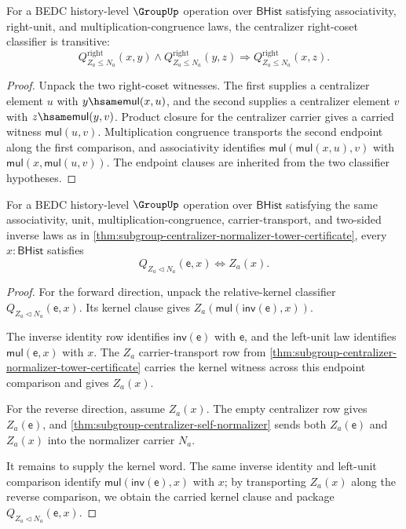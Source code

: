 \begin{theorem}
\label{thm:subgroup-centralizer-right-coset-classifier-trans}
For a BEDC history-level $\GroupUp$ operation over $\mathsf{BHist}$ satisfying
associativity, right-unit, and multiplication-congruence laws, the centralizer
right-coset classifier is transitive:
$$
Q^{\mathrm{right}}_{Z_a\leq N_a}(x,y)\land
Q^{\mathrm{right}}_{Z_a\leq N_a}(y,z)
\Longrightarrow Q^{\mathrm{right}}_{Z_a\leq N_a}(x,z).
$$
\end{theorem}
\begin{proof}
Unpack the two right-coset witnesses. The first supplies a centralizer element
$u$ with $y\hsame \mathsf{mul}(x,u)$, and the second supplies a centralizer
element $v$ with $z\hsame \mathsf{mul}(y,v)$. Product closure for the
centralizer carrier gives a carried witness $\mathsf{mul}(u,v)$. Multiplication
congruence transports the second endpoint along the first comparison, and
associativity identifies
$\mathsf{mul}(\mathsf{mul}(x,u),v)$ with
$\mathsf{mul}(x,\mathsf{mul}(u,v))$. The endpoint clauses are inherited from
the two classifier hypotheses.
\end{proof}

\begin{theorem}
\label{thm:subgroup-centralizer-quotient-kernel-empty-fiber}
For a BEDC history-level $\GroupUp$ operation over $\mathsf{BHist}$
satisfying the same associativity, unit, multiplication-congruence,
carrier-transport, and two-sided inverse laws as in
\autoref{thm:subgroup-centralizer-normalizer-tower-certificate}, every
$x:\mathsf{BHist}$ satisfies
$$
Q_{Z_a\triangleleft N_a}(\mathsf{e},x)\Longleftrightarrow Z_a(x).
$$
\end{theorem}
\begin{proof}
For the forward direction, unpack the relative-kernel classifier
$Q_{Z_a\triangleleft N_a}(\mathsf{e},x)$. Its kernel clause gives
$Z_a(\mathsf{mul}(\mathsf{inv}(\mathsf{e}),x))$.

The inverse identity row identifies $\mathsf{inv}(\mathsf{e})$ with
$\mathsf{e}$, and the left-unit law identifies
$\mathsf{mul}(\mathsf{e},x)$ with $x$. The $Z_a$ carrier-transport row from
\autoref{thm:subgroup-centralizer-normalizer-tower-certificate} carries the
kernel witness across this endpoint comparison and gives $Z_a(x)$.

For the reverse direction, assume $Z_a(x)$. The empty centralizer row gives
$Z_a(\mathsf{e})$, and
\autoref{thm:subgroup-centralizer-self-normalizer} sends both $Z_a(\mathsf{e})$
and $Z_a(x)$ into the normalizer carrier $N_a$.

It remains to supply the kernel word. The same inverse identity and left-unit
comparison identify $\mathsf{mul}(\mathsf{inv}(\mathsf{e}),x)$ with $x$; by
transporting $Z_a(x)$ along the reverse comparison, we obtain the carried
kernel clause and package
$Q_{Z_a\triangleleft N_a}(\mathsf{e},x)$.
\end{proof}

